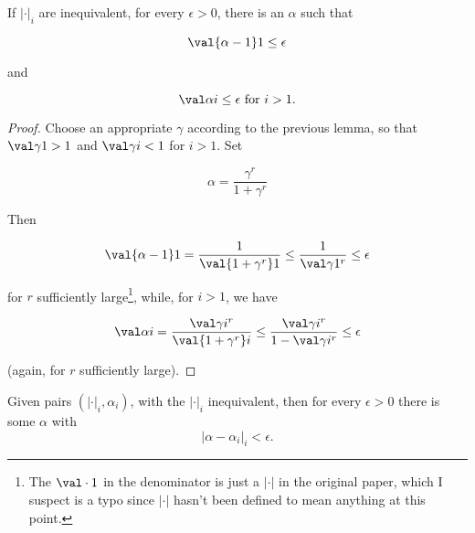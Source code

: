 \begin{lemma}
  If $|\cdot|_i$ are inequivalent, for every $\epsilon>0$, there is an $\alpha$
  such that

  \[ \val {\alpha - 1} 1 \leq \epsilon \]

  and

  \[ \val \alpha i \leq \epsilon \text{ for }i>1. \]

\end{lemma}

\begin{proof}
  Choose an appropriate $\gamma$ according to the previous lemma, so that $\val
  \gamma 1 > 1$ and $\val \gamma i < 1$ for $i > 1$. Set

  \[ \alpha = \frac {\gamma^r} {1 + \gamma^r} \]

  Then

  \[ \val {\alpha - 1} 1 = \frac 1 {\val {1 + \gamma^r} 1} \leq \frac 1 {\val
      \gamma 1 ^r}\leq \epsilon \]

  for $r$ sufficiently large\footnote{The $\val \cdot 1$ in the denominator is just a
    $|\cdot|$ in the original paper, which I suspect is a typo since $|\cdot|$
    hasn't been defined to mean anything at this point.}, while, for $i>1$, we have

  \[ \val \alpha i = \frac {\val \gamma i ^r} {\val {1 + \gamma^r} i} \leq \frac
    {\val \gamma i ^r} {1 - \val \gamma i ^r} \leq \epsilon \]

  (again, for $r$ sufficiently large).

\end{proof}

\begin{thm}
  \label{eq:approximation}

  Given pairs $(|\cdot|_i, \alpha_i)$, with the $|\cdot|_i$ inequivalent,
  then for every $\epsilon>0$ there is some $\alpha$ with
  \[|\alpha - \alpha_i|_i < \epsilon.\]
\end{thm}

